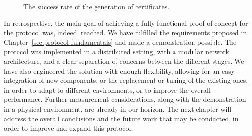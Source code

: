 \begin{figure} [h!]
    \begin{center}
        \caption{The success rate of the generation of \pol{} certificates.}
        \label{fig:block-time-success-rate}
    \end{center}
\end{figure}

In retrospective, the main goal of achieving a fully functional proof-of-concept for the \pol{} protocol was, indeed, reached. We have fulfilled the requirements proposed in Chapter~\ref{sec:protocol-fundamentals} and made a demonstration possible. The protocol was implemented in a distributed setting, with a modular network architecture, and a clear separation of concerns between the different stages. We have also engineered the solution with enough flexibility, allowing for an easy integration of new components, or the replacement or tuning of the existing ones, in order to adapt to different environments, or to improve the overall performance. Further measurement considerations, along with the demonstration in a physical environment, are already in our horizon. The next chapter will address the overall conclusions and the future work that may be conducted, in order to improve and expand this \pol{} protocol.


    
